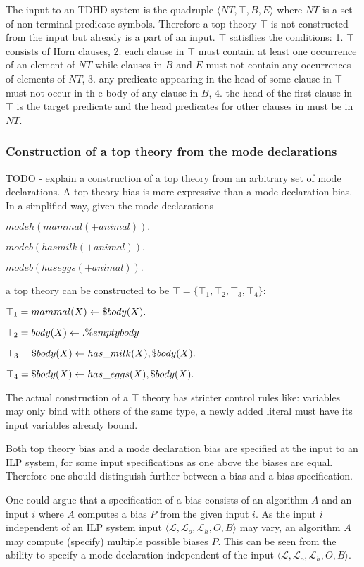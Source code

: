 The input to an TDHD system is the quadruple $\langle NT, \top, B, E \rangle$ where $NT$ is a set of non-terminal  predicate symbols. Therefore a top theory $\top$ is not constructed from the input but already is a part of an input. $\top$ satisflies the conditions:
1. $\top$ consists of Horn clauses,
2. each clause in $\top$
must contain at least one occurrence of an element of $NT$ while clauses in $B$
and $E$ must not contain any occurrences of elements of $NT$,
3. any predicate appearing in the head of some clause in $\top$ must not occur in th	e body of any clause in $B$,
4. the head of the first clause in $\top$ is the target predicate and
the head predicates for other clauses in must be in $NT$.

\subsubsection{Construction of a top theory from the mode declarations\cite{muggleton2008}}
TODO - explain a construction of a top theory from an arbitrary set of mode declarations.
A top theory bias is more expressive than a mode declaration bias.
In a simplified way, given the mode declarations

$modeh(mammal(+animal)).$

$modeb(has milk(+animal)).$

$modeb(has eggs(+animal)).$

a top theory can be constructed to be $\top=\{\top_1, \top_2, \top_3, \top_4\}$:

$\top_1=mammal(X) \leftarrow \$body(X).$

$\top_2=body(X) \leftarrow .\%emptybody$

$\top_3=\$body(X) \leftarrow has\_milk(X), \$body(X).$

$\top_4=\$body(X) \leftarrow has\_eggs(X), \$body(X).$

The actual construction of a $\top$ theory has stricter control rules like: variables may only bind with others of the same type, a newly added literal must have its input variables already bound.

Both top theory bias and a mode declaration bias are specified at the input to an ILP system, for some input specifications as one above the biases are equal. Therefore one should distinguish further between a bias and a bias specification.

One could argue that a specification of a bias consists of an algorithm $A$ and an input $i$ where $A$ computes a bias $P$ from the given input $i$. As the input $i$ independent of an ILP system input $\langle\mathcal{L}, \mathcal{L}_o, \mathcal{L}_h, O, B\rangle$ may vary, an algorithm $A$ may compute (specify) multiple possible biases $P$. This can be seen from the ability to specify a mode declaration independent of the input
$\langle\mathcal{L}, \mathcal{L}_o, \mathcal{L}_h, O, B\rangle$.

